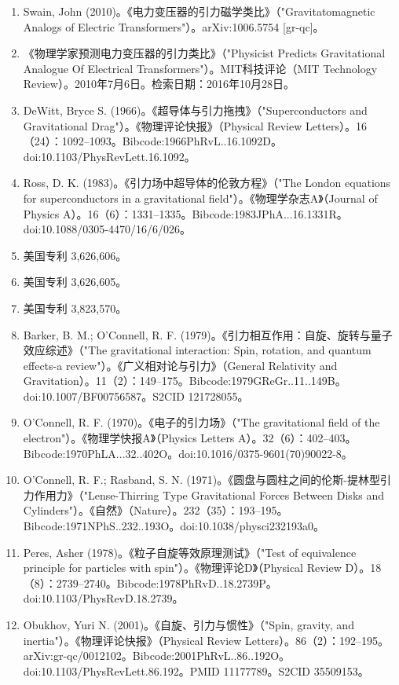 \begin{enumerate}
\item Swain, John (2010)。《电力变压器的引力磁学类比》（"Gravitatomagnetic Analogs of Electric Transformers"）。arXiv:1006.5754 [gr-qc]。
\item 《物理学家预测电力变压器的引力类比》（"Physicist Predicts Gravitational Analogue Of Electrical Transformers"）。MIT科技评论（MIT Technology Review）。2010年7月6日。检索日期：2016年10月28日。
\item DeWitt, Bryce S. (1966)。《超导体与引力拖拽》（"Superconductors and Gravitational Drag"）。《物理评论快报》（Physical Review Letters）。16（24）：1092–1093。Bibcode:1966PhRvL..16.1092D。doi:10.1103/PhysRevLett.16.1092。
\item Ross, D. K. (1983)。《引力场中超导体的伦敦方程》（"The London equations for superconductors in a gravitational field"）。《物理学杂志A》（Journal of Physics A）。16（6）：1331–1335。Bibcode:1983JPhA...16.1331R。doi:10.1088/0305-4470/16/6/026。
\item 美国专利 3,626,606。
\item 美国专利 3,626,605。
\item 美国专利 3,823,570。
\item Barker, B. M.; O'Connell, R. F. (1979)。《引力相互作用：自旋、旋转与量子效应综述》（"The gravitational interaction: Spin, rotation, and quantum effects-a review"）。《广义相对论与引力》（General Relativity and Gravitation）。11（2）：149–175。Bibcode:1979GReGr..11..149B。doi:10.1007/BF00756587。S2CID 121728055。
\item O'Connell, R. F. (1970)。《电子的引力场》（"The gravitational field of the electron"）。《物理学快报A》（Physics Letters A）。32（6）：402–403。Bibcode:1970PhLA...32..402O。doi:10.1016/0375-9601(70)90022-8。
\item O'Connell, R. F.; Rasband, S. N. (1971)。《圆盘与圆柱之间的伦斯-提林型引力作用力》（"Lense-Thirring Type Gravitational Forces Between Disks and Cylinders"）。《自然》（Nature）。232（35）：193–195。Bibcode:1971NPhS..232..193O。doi:10.1038/physci232193a0。
\item Peres, Asher (1978)。《粒子自旋等效原理测试》（"Test of equivalence principle for particles with spin"）。《物理评论D》（Physical Review D）。18（8）：2739–2740。Bibcode:1978PhRvD..18.2739P。doi:10.1103/PhysRevD.18.2739。
\item Obukhov, Yuri N. (2001)。《自旋、引力与惯性》（"Spin, gravity, and inertia"）。《物理评论快报》（Physical Review Letters）。86（2）：192–195。arXiv:gr-qc/0012102。Bibcode:2001PhRvL..86..192O。doi:10.1103/PhysRevLett.86.192。PMID 11177789。S2CID 35509153。

\end{enumerate}
